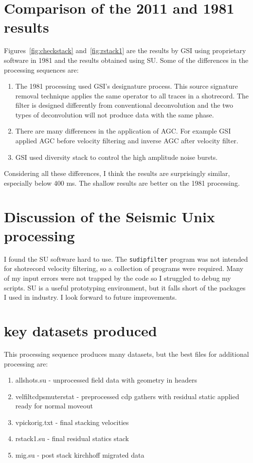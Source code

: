 
\section{Comparison of the 2011 and 1981 results}
Figures~\ref{fig:checkstack} and~\ref{fig:rstack1} are the results by GSI 
using proprietary software in 1981 and the results obtained using SU.  
Some of the differences in the processing sequences are:
\begin{enumerate}
\item The 1981 processing used GSI's designature process.  This source 
signature removal technique applies the same operator to all traces in a 
shotrecord.  The filter is designed differently from conventional 
deconvolution and the two types of deconvolution will not produce data 
with the same phase. 
\item There are many differences in the application of AGC.  For example 
GSI applied AGC before velocity filtering and inverse AGC after velocity 
filter.
\item GSI used diversity stack to control the high amplitude noise bursts.
\end{enumerate}
Considering all these differences, I think the results are surprisingly 
similar, especially below 400 ms.  The shallow results are better on the 
1981 processing.

\section{Discussion of the Seismic Unix processing}
I found the SU software hard to use.  The \texttt{sudipfilter} program
was not intended for shotrecord velocity filtering, so a collection of
programs were required.  Many of my input errors were not trapped by
the code so I struggled to debug my scripts.  SU is a useful
prototyping environment, but it falls short of the packages I used in 
industry.  I look forward to future improvements.

\section{key datasets produced}
This processing sequence produces many datasets, but the best files for 
additional processing are:
\begin{enumerate}
\item allshots.su - unprocessed field data with geometry in headers
\item velfiltcdpsmuterstat - preprocessed cdp gathers with residual static applied ready for normal moveout
\item vpickorig.txt - final stacking velocities
\item rstack1.su - final residual statics stack
\item mig.su - post stack kirchhoff migrated data
\end{enumerate}

